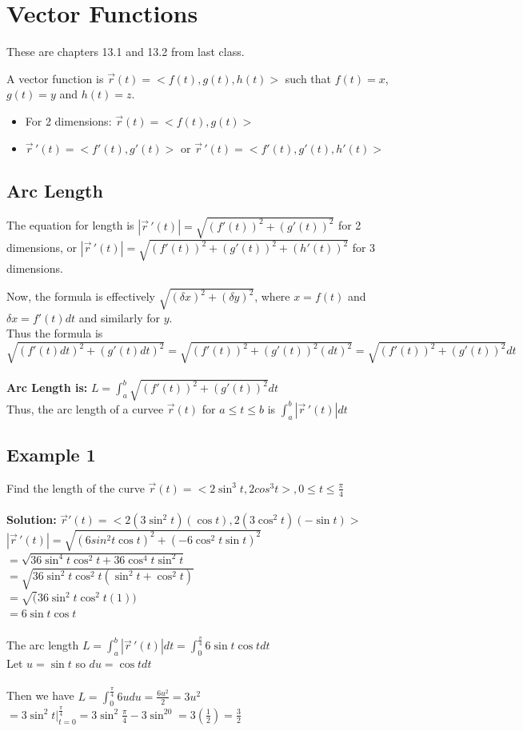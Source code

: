 \documentclass{article}
\begin{document}
\newpage
\section{Vector Functions}
These are chapters 13.1 and 13.2 from last class.

A vector function is $\vec{r}(t)=<f(t),g(t),h(t)>$ such that $f(t)=x$, $g(t)=y$ and $h(t)=z$.
\begin{itemize}
    \item For 2 dimensions: $\vec{r}(t)=<f(t),g(t)>$
    \item $\vec{r}\,'(t)=<f'(t),g'(t)>$ or $\vec{r}\,'(t)=<f'(t),g'(t),h'(t)>$
\end{itemize}

\subsection{Arc Length}
The equation for length is $|\vec{r}\,'(t)|=\sqrt{(f'(t))^2+(g'(t))^2}$ for 2 dimensions,
or $|\vec{r}\,'(t)|=\sqrt{(f'(t))^2+(g'(t))^2+(h'(t))^2}$ for 3 dimensions.

Now, the formula is effectively $\sqrt{(\delta x)^2 + (\delta y)^2}$, where $x=f(t)$ and $\delta x=f'(t)dt$ and similarly for $y$.
\\Thus the formula is $\sqrt{(f'(t)dt)^2+(g'(t)dt)^2}=\sqrt{(f'(t))^2+(g'(t))^2(dt)^2}=\sqrt{(f'(t))^2+(g'(t))^2}dt$
\\\\\textbf{Arc Length is: } $L=\int_{a}^{b} \sqrt{(f'(t))^2+(g'(t))^2}dt$
\\Thus, the arc length of a curvee $\vec{r}(t)$ for $a\leq t\leq b$ is $\int_{a}^{b} |\vec{r}\,'(t)|dt$

\subsection{Example 1}
Find the length of the curve $\vec{r}(t)=<2\sin^3t,2cos^3t>, 0\leq t\leq \frac{\pi}{4}$
\\\\\textbf{Solution:} $\vec{r} '(t)=<2(3\sin^2t)(\cos t), 2(3\cos^2t)(-\sin t)>$
\\$|\vec{r}\,'(t)|=\sqrt{(6sin^2t \cos t)^2+(-6\cos^2t \sin t)^2}$
\\$=\sqrt{36\sin^4t \cos^2t+36\cos^4t\sin^2t}$
\\$=\sqrt{36\sin^2t\cos^2t(\sin^2t+\cos^2t)}$
\\$=\sqrt(36\sin^2t\cos^2t(1))$
\\$=6\sin t\cos t$
\\\\The arc length $L=\int_{a}^{b} |\vec{r}\,'(t)|dt=\int_{0}^{\frac{\pi}{4}} 6\sin t\cos tdt$
\\Let $u=\sin t$ so $du=\cos tdt$
\\\\Then we have $L=\int_{0}^{\frac{\pi}{4}} 6udu=\frac{6u^2}{2}=3u^2$
\\$=3\sin^2t |_{t=0}^{\frac{\pi}{4}}=3\sin^2\frac{\pi}{4}-3\sin^20=3(\frac{1}{2})=\frac{3}{2}$
\end{document}

